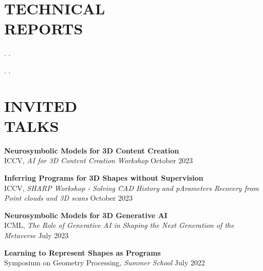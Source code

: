\documentclass[line,margin]{res}
\begin{document}
\begin{resume}
\section {TECHNICAL\\REPORTS}

. 
.

. 
.




\section{INVITED\\TALKS}

\newcommand{\talktitle}[1]{
	\textbf{#1}
}
\newcommand{\talk}[3]{
	#1, \emph{#2} \hfill #3
}

\talktitle{Neurosymbolic Models for 3D Content Creation}\\
\talk
	{ICCV}
	{AI for 3D Content Creation Workshop}
	{October 2023}

\talktitle{Inferring Programs for 3D Shapes without Supervision}\\
\talk
	{ICCV}
	{SHARP Workshop - Solving CAD History and pArameters Recovery from Point clouds and 3D scans}
	{October 2023}

\talktitle{Neurosymbolic Models for 3D Generative AI}\\
\talk
	{ICML}
	{The Role of Generative AI in Shaping the Next Generation of the Metaverse}
	{July 2023}

\talktitle{Learning to Represent Shapes as Programs}\\
\talk
	{Symposium on Geometry Processing}
	{Summer School}
	{July 2022}


\end{resume}
\end{document}
